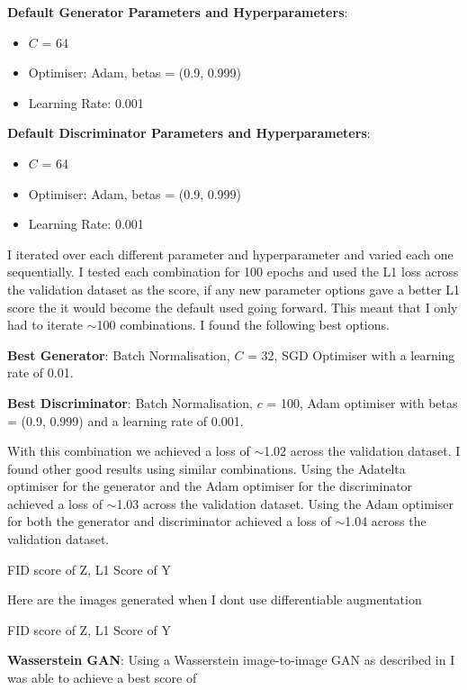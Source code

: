 \documentclass{UoYCSproject}
\begin{document}
\textbf{Default Generator Parameters and Hyperparameters}: 
\begin{itemize}
\item $C$ = 64
\item Optimiser: Adam, betas = (0.9, 0.999)
\item Learning Rate: 0.001
\end{itemize}
\textbf{Default Discriminator Parameters and Hyperparameters}:
\begin{itemize}
\item $C$ = 64
\item Optimiser: Adam, betas = (0.9, 0.999)
\item Learning Rate: 0.001
\end{itemize}
I iterated over each different parameter and hyperparameter and varied each one sequentially. I tested each combination for 100 epochs and used the L1 loss across the validation dataset as the score, if any new parameter options gave a better L1 score the it would become the default used going forward. This meant that I only had to iterate \(\sim\)100 combinations. I found the following best options.

\textbf{Best Generator}: Batch Normalisation, $C$ = 32, SGD Optimiser with a learning rate of 0.01.

\textbf{Best Discriminator}: Batch Normalisation, $c$ = 100, Adam optimiser with betas = (0.9, 0.999) and a learning rate of 0.001.

With this combination we achieved a loss of \(\sim\)1.02 across the validation dataset. I found other good results using similar combinations. Using the Adatelta optimiser for the generator and the Adam optimiser for the discriminator achieved a loss of \(\sim\)1.03 across the validation dataset. Using the Adam optimiser for both the generator and discriminator achieved a loss of \(\sim\)1.04 across the validation dataset.


FID score of Z, L1 Score of Y

Here are the images generated when I dont use differentiable augmentation

FID score of Z, L1 Score of Y

\textbf{Wasserstein GAN}: Using a Wasserstein image-to-image GAN as described in \cite{pix2pixwasserstein} I was able to achieve a best score of
\end{document}
